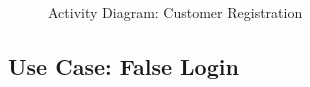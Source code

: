 \documentclass[a4paper,12pt]{report}
\begin{document}
\begin{figure}[!htbp]
	\centering
	\caption{\label{fig:act_customer_registration}Activity Diagram: Customer Registration}	
\end{figure}



\FloatBarrier
\subsection{Use Case: False Login}
\end{document}
